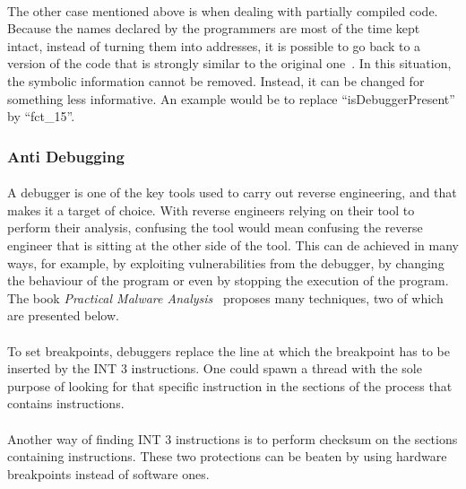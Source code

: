 \paragraph{}
The other case mentioned above is when dealing with partially compiled code. Because the names declared by the programmers are most of the time kept intact, instead of turning them into addresses, it is possible to go back to a version of the code that is strongly similar to the original one~\cite{eilam2005reversing}. In this situation, the symbolic information cannot be removed. Instead, it can be changed for something less informative. An example would be to replace “isDebuggerPresent” by “fct\_15”.

\subsubsection{Anti Debugging}
\paragraph{}
A debugger is one of the key tools used to carry out reverse engineering, and that makes it a target of choice. With reverse engineers relying on their tool to perform their analysis, confusing the tool would mean confusing the reverse engineer that is sitting at the other side of the tool. This can de achieved in many ways, for example, by exploiting vulnerabilities from the debugger, by changing the behaviour of the program or even by stopping the execution of the program. The book \textit{Practical Malware Analysis}~\cite{sikorski2012practical} proposes many techniques, two of which are presented below.

\paragraph{}
To set breakpoints, debuggers replace the line at which the breakpoint has to be inserted by the INT 3 instructions. One could spawn a thread with the sole purpose of looking for that specific instruction in the sections of the process that contains instructions.

\paragraph{}
Another way of finding INT 3 instructions is to perform checksum on the sections containing instructions. These two protections can be beaten by using hardware breakpoints instead of software ones.

